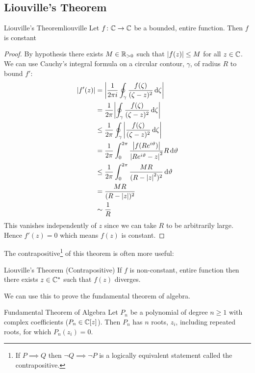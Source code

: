 \documentclass{article}
\begin{document}
    \subsection{Liouville's Theorem}
    \begin{theorem}{Liouville's Theorem}{liouville}
        Let \(f\colon\mathbb{C}\to\mathbb{C}\) be a bounded, entire function.
        Then \(f\) is constant
    \end{theorem}
    \begin{proof}
        By hypothesis there exists \(M\in\mathbb{R}_{>0}\) such that \(\abs{f(z)} \le M\) for all \(z\in\mathbb{C}\).
        We can use Cauchy's integral formula on a circular contour, \(\gamma\), of radius \(R\) to bound \(f'\):
        \begin{align*}
            \abs{f'(z)} &= \abs{\frac{1}{2\pi i} \oint_{\gamma} \frac{f(\zeta)}{(\zeta - z)^2} \dd{\zeta}}\\
            &= \frac{1}{2\pi} \abs{\oint_\gamma \frac{f(\zeta)}{(\zeta - z)^2} \dd{\zeta}}\\
            &\le \frac{1}{2\pi} \oint_\gamma \abs{\frac{f(\zeta)}{(\zeta - z)^2}\dd{\zeta}}\\
            &= \frac{1}{2\pi} \int_0^{2\pi} \frac{\abs{f(Re^{i\vartheta})}}{\abs{Re^{i\vartheta} - z}^2} R\dd{\vartheta}\\
            &\le \frac{1}{2\pi} \int_0^{2\pi} \frac{MR}{(R - \abs{z}^2)^2}\dd{\vartheta}\\
            &= \frac{MR}{(R - \abs{z})^2}\\
            &\sim \frac{1}{R}
        \end{align*}
        This vanishes independently of \(z\) since we can take \(R\) to be arbitrarily large.
        Hence \(f'(z) = 0\) which means \(f(z)\) is constant.
    \end{proof}
    The contrapositive\footnote{If \(P\implies Q\) then \(\neg Q\implies \neg P\) is a logically equivalent statement called the contrapositive.} of this theorem is often more useful:
    \addtocounter{theoremCounter}{-1}
    \begin{theorem}{Liouville's Theorem (Contrapositive)}{}
        If \(f\) is non-constant, entire function then there exists \(z\in\mathbb{C}^*\) such that \(f(z)\) diverges.
    \end{theorem}
    We can use this to prove the fundamental theorem of algebra.
    \begin{theorem}{Fundamental Theorem of Algebra}{}
        Let \(P_n\) be a polynomial of degree \(n \ge 1\) with complex coefficients (\(P_n\in\mathbb{C}[z]\)).
        Then \(P_n\) has \(n\) roots, \(z_i\), including repeated roots, for which \(P_n(z_i) = 0\).
    \end{theorem}
\end{document}
